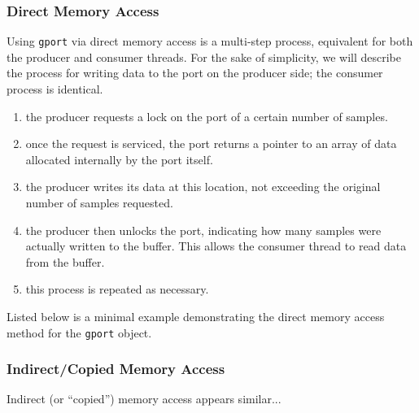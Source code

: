 \subsubsection{Direct Memory Access}
Using {\tt gport} via direct memory access is a multi-step process, equivalent
for both the producer and consumer threads.
For the sake of simplicity, we will describe the process for writing data to
the port on the producer side; the consumer process is identical.
%
\begin{enumerate}
\item the producer requests a lock on the port of a certain number of samples.
\item once the request is serviced, the port returns a pointer to an array of
      data allocated internally by the port itself.
\item the producer writes its data at this location, not exceeding the
      original number of samples requested.
\item the producer then unlocks the port, indicating how many samples were
      actually written to the buffer.
      This allows the consumer thread to read data from the buffer.
\item this process is repeated as necessary.
\end{enumerate}
%
Listed below is a minimal example demonstrating the direct memory access
method for the {\tt gport} object.
%

%

\subsubsection{Indirect/Copied Memory Access}
Indirect (or ``copied'') memory access appears similar...



